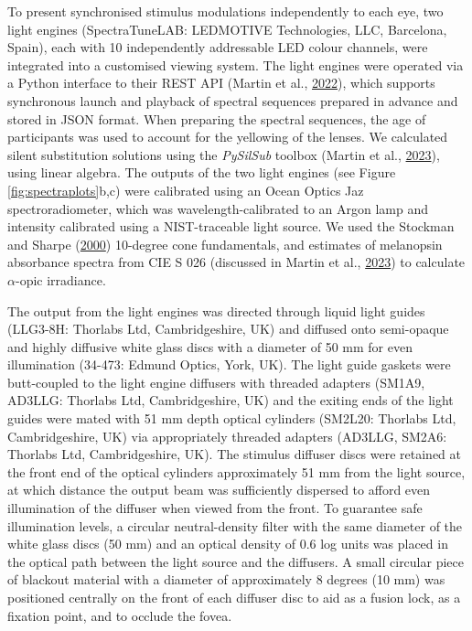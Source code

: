 \documentclass[
]{article}
\begin{document}
To present synchronised stimulus modulations independently to each eye, two light engines (SpectraTuneLAB: LEDMOTIVE Technologies, LLC, Barcelona, Spain), each with 10 independently addressable LED colour channels, were integrated into a customised viewing system. The light engines were operated via a Python interface to their REST API (Martin et al., \protect\hyperlink{ref-Martin2022}{2022}), which supports synchronous launch and playback of spectral sequences prepared in advance and stored in JSON format. When preparing the spectral sequences, the age of participants was used to account for the yellowing of the lenses. We calculated silent substitution solutions using the \emph{PySilSub} toolbox (Martin et al., \protect\hyperlink{ref-Martin2023}{2023}), using linear algebra. The outputs of the two light engines (see Figure \ref{fig:spectraplots}b,c) were calibrated using an Ocean Optics Jaz spectroradiometer, which was wavelength-calibrated to an Argon lamp and intensity calibrated using a NIST-traceable light source. We used the Stockman and Sharpe (\protect\hyperlink{ref-Stockman2000}{2000}) 10-degree cone fundamentals, and estimates of melanopsin absorbance spectra from CIE S 026 (discussed in Martin et al., \protect\hyperlink{ref-Martin2023}{2023}) to calculate \(\alpha\)-opic irradiance.

The output from the light engines was directed through liquid light guides (LLG3-8H: Thorlabs Ltd, Cambridgeshire, UK) and diffused onto semi-opaque and highly diffusive white glass discs with a diameter of 50 mm for even illumination (34-473: Edmund Optics, York, UK). The light guide gaskets were butt-coupled to the light engine diffusers with threaded adapters (SM1A9, AD3LLG: Thorlabs Ltd, Cambridgeshire, UK) and the exiting ends of the light guides were mated with 51 mm depth optical cylinders (SM2L20: Thorlabs Ltd, Cambridgeshire, UK) via appropriately threaded adapters (AD3LLG, SM2A6: Thorlabs Ltd, Cambridgeshire, UK). The stimulus diffuser discs were retained at the front end of the optical cylinders approximately 51 mm from the light source, at which distance the output beam was sufficiently dispersed to afford even illumination of the diffuser when viewed from the front. To guarantee safe illumination levels, a circular neutral-density filter with the same diameter of the white glass discs (50 mm) and an optical density of 0.6 log units was placed in the optical path between the light source and the diffusers. A small circular piece of blackout material with a diameter of approximately 8 degrees (10 mm) was positioned centrally on the front of each diffuser disc to aid as a fusion lock, as a fixation point, and to occlude the fovea.
\end{document}
